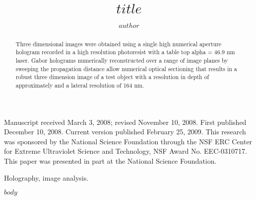 \documentclass[]{IEEEphot}
\begin{document}
\title{$title$}

\author{$author$}

\affil{}  

%

\maketitle


\begin{receivedinfo}%
Manuscript received March 3, 2008; revised November 10, 2008. First published December 10, 2008. Current version published February 25, 2009. This research was sponsored by the National Science Foundation through the NSF ERC Center for Extreme Ultraviolet Science and Technology, NSF Award No. EEC-0310717. This paper was presented in part at the National Science Foundation.
\end{receivedinfo}

\begin{abstract}
Three dimensional images were obtained using a single high numerical aperture hologram recorded in a high resolution photoresist with a table top alpha = 46.9 nm laser. Gabor holograms numerically reconstructed over a range of image planes by sweeping the propagation distance allow numerical optical sectioning that results in a robust three dimension image of a test object with a resolution in depth of approximately and a lateral resolution of 164 nm. 
\end{abstract}

\begin{IEEEkeywords}
Holography, image analysis.
\end{IEEEkeywords}

$body$
\end{document}
